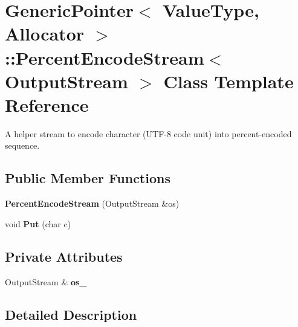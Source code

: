 \hypertarget{class_generic_pointer_1_1_percent_encode_stream}{}\section{Generic\+Pointer$<$ Value\+Type, Allocator $>$\+:\+:Percent\+Encode\+Stream$<$ Output\+Stream $>$ Class Template Reference}
\label{class_generic_pointer_1_1_percent_encode_stream}


A helper stream to encode character (U\+T\+F-\/8 code unit) into percent-\/encoded sequence.  


\subsection*{Public Member Functions}
\begin{DoxyCompactItemize}
\item 
{\bfseries Percent\+Encode\+Stream} (Output\+Stream \&os)\hypertarget{class_generic_pointer_1_1_percent_encode_stream_a8e16af18669e49d0ab528ba0066475d2}{}\label{class_generic_pointer_1_1_percent_encode_stream_a8e16af18669e49d0ab528ba0066475d2}

\item 
void {\bfseries Put} (char c)\hypertarget{class_generic_pointer_1_1_percent_encode_stream_ab932ed9ab00c9e0672755133fc8d8c11}{}\label{class_generic_pointer_1_1_percent_encode_stream_ab932ed9ab00c9e0672755133fc8d8c11}

\end{DoxyCompactItemize}
\subsection*{Private Attributes}
\begin{DoxyCompactItemize}
\item 
Output\+Stream \& {\bfseries os\+\_\+}\hypertarget{class_generic_pointer_1_1_percent_encode_stream_a973de3c4a6b987a4fd301b8266d45d4a}{}\label{class_generic_pointer_1_1_percent_encode_stream_a973de3c4a6b987a4fd301b8266d45d4a}

\end{DoxyCompactItemize}


\subsection{Detailed Description}
